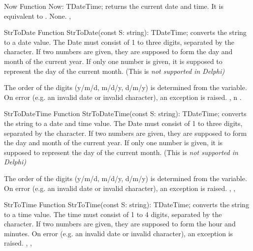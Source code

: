 

\begin{function}{Now}
\Declaration
Function Now: TDateTime;
\Description
{} returns the current date and time. It is equivalent to
.
\Errors
None.
\SeeAlso
{}, 
\end{function}



\begin{function}{StrToDate}
\Declaration
Function StrToDate(const S: string): TDateTime;
\Description
{} converts the string  to a  date
value. The Date must consist of 1 to three digits, separated by the
 character. If two numbers are given, they
are supposed to form the day and month of the current year. If only
one number is given, it is supposed to represent the day of the
current month. (This is \em{not} supported in Delphi)

The order of the digits (y/m/d, m/d/y, d/m/y) is determined from the
 variable.
\Errors
On error (e.g. an invalid date or invalid character),
an  exception is raised.
\SeeAlso
{}, n .
\end{function}



\begin{function}{StrToDateTime}
\Declaration
Function StrToDateTime(const S: string): TDateTime;
\Description
{} converts the string  to a  date
and time value. The Date must consist of 1 to three digits, separated by the
 character. If two numbers are given, they
are supposed to form the day and month of the current year. If only
one number is given, it is supposed to represent the day of the
current month. (This is \em{not} supported in Delphi)

The order of the digits (y/m/d, m/d/y, d/m/y) is determined from the
 variable.
\Errors
On error (e.g. an invalid date or invalid character),
an  exception is raised.
\SeeAlso
{}, , 
\end{function}



\begin{function}{StrToTime}
\Declaration
Function StrToTime(const S: string): TDateTime;
\Description
{} converts the string  to a  time
value. The time must consist of 1 to 4 digits, separated by the
 character. If two numbers are given, they
are supposed to form the hour and minutes.
\Errors
On error (e.g. an invalid date or invalid character),
an  exception is raised.
\SeeAlso
{}, , 
\end{function}

